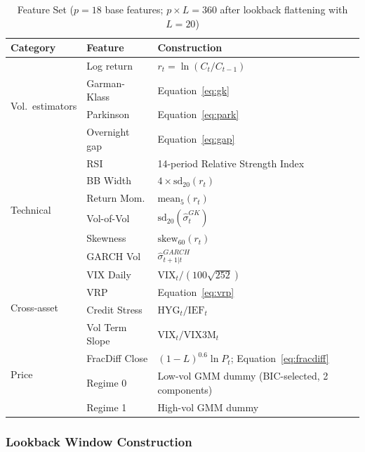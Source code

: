 \documentclass[12pt]{article}
\begin{document}
\begin{table}[htbp]
\centering
\caption{Feature Set ($p = 18$ base features; $p \times L = 360$ after
         lookback flattening with $L = 20$)}
\label{tab:features}
\begin{tabular}{llp{6.8cm}}
\toprule
Category & Feature & Construction \\
\midrule
\multirow{4}{*}{Vol.\ estimators}
  & Log return      & $r_{t} = \ln(C_{t}/C_{t-1})$ \\
  & Garman-Klass    & Equation~\eqref{eq:gk} \\
  & Parkinson       & Equation~\eqref{eq:park} \\
  & Overnight gap   & Equation~\eqref{eq:gap} \\
\midrule
\multirow{6}{*}{Technical}
  & RSI             & 14-period Relative Strength Index \\
  & BB Width        & $4 \times \text{sd}_{20}(r_{t})$ \\
  & Return Mom.     & $\text{mean}_{5}(r_{t})$ \\
  & Vol-of-Vol      & $\text{sd}_{20}(\hat{\sigma}_{t}^{GK})$ \\
  & Skewness        & $\text{skew}_{60}(r_{t})$ \\
  & GARCH Vol       & $\hat{\sigma}_{t+1|t}^{GARCH}$ \\
\midrule
\multirow{4}{*}{Cross-asset}
  & VIX Daily       & $\text{VIX}_{t}/(100\sqrt{252})$ \\
  & VRP             & Equation~\eqref{eq:vrp} \\
  & Credit Stress   & $\text{HYG}_{t}/\text{IEF}_{t}$ \\
  & Vol Term Slope  & $\text{VIX}_{t}/\text{VIX3M}_{t}$ \\
\midrule
\multirow{2}{*}{Price}
  & FracDiff Close  & $(1-L)^{0.6}\ln P_{t}$; Equation~\eqref{eq:fracdiff} \\
\midrule
\multirow{2}{*}{Regime}
  & Regime 0        & Low-vol GMM dummy (BIC-selected, 2 components) \\
  & Regime 1        & High-vol GMM dummy \\
\bottomrule
\end{tabular}
\end{table}

\subsubsection*{Lookback Window Construction}
\end{document}
